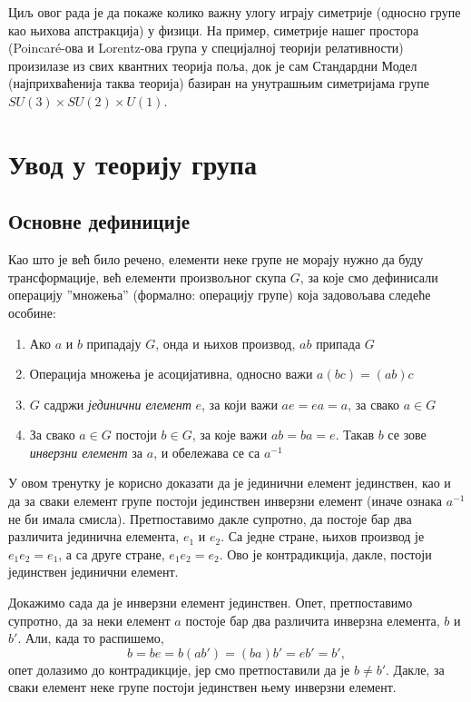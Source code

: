 \documentclass{report}
\theoremstyle{plain}
\theoremstyle{definition}
\begin{document}
Циљ овог рада је да покаже колико важну улогу играју симетрије (односно групе као њихова апстракција) у физици. На пример, симетрије нашег простора (Poincaré-ова и Lorentz-ова група у специјалној теорији релативности) произилазе из свих квантних теорија поља, док је сам Стандардни Модел (најприхваћенија таква теорија) базиран на унутрашњим симетријама групе $SU(3)\times SU(2)\times U(1)$.

\chapter{Увод у теорију група}
\section{Основне дефиниције}
Као што је већ било речено, елементи неке групе не морају нужно да буду трансформације, већ елементи произвољног скупа $G$, за које смо дефинисали операцију ''множења'' (формално: операцију групе) која задовољава следеће особине:
\begin{enumerate}
  \item Ако $a$ и $b$ припадају $G$, онда и њихов производ, $ab$ припада $G$
  \item Операција множења је асоцијативна, односно важи $a(bc) = (ab)c$
  \item $G$ садржи \emph{јединични елемент} $e$, за који важи $ae = ea = a$, за свако $a\in G$
  \item За свако $a\in G$ постоји $b\in G$, за које важи $ab = ba = e$. Такав $b$ се зове \emph{инверзни елемент} за $a$, и обележава се са $a^{-1}$
\end{enumerate}
У овом тренутку је корисно доказати да је јединични елемент јединствен, као и да за сваки елемент групе постоји јединствен инверзни елемент (иначе ознака $a^{-1}$ не би имала смисла). Претпоставимо дакле супротно, да постоје бар два различита јединична елемента, $e_1$ и $e_2$. Са једне стране, њихов производ је $e_1 e_2 = e_1$, а са друге стране, $e_1 e_2 = e_2$. Ово је контрадикција, дакле, постоји јединствен јединични елемент.

Докажимо сада да је инверзни елемент јединствен. Опет, претпоставимо супротно, да за неки елемент $a$ постоје бар два различита инверзна елемента, $b$ и $b'$. Али, када то распишемо,
$$b = be = b(ab') = (ba)b' = eb' = b',$$
опет долазимо до контрадикције, јер смо претпоставили да је $b\neq b'$. Дакле, за сваки елемент неке групе постоји јединствен њему инверзни елемент.
\end{document}
